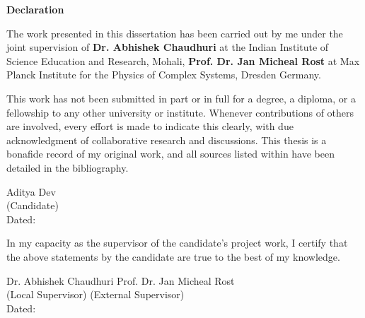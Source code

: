\begin{center}
    \textbf{\Large Declaration}
\end{center}
The work presented in this dissertation has been carried out by me under the joint supervision of 
\textbf{Dr. Abhishek Chaudhuri} at the Indian Institute of Science Education and Research, Mohali, 
\textbf{Prof. Dr.  Jan Micheal Rost} 
at Max Planck Institute for the Physics of Complex Systems, Dresden Germany. 

\vspace{0.4cm}

This work has not been submitted in part or in full for a degree, a diploma, or a fellowship to any other university or institute. Whenever contributions of others are involved, every effort is made to indicate this clearly, with due acknowledgment of collaborative research and discussions. This thesis is a bonafide record of my original work, and all sources listed within have been detailed in the bibliography.

\vspace{2cm}

\begin{flushright}
Aditya Dev
\\
(Candidate)
\\
Dated: 
\end{flushright}

In my capacity as the supervisor of the candidate's project work, I certify that the above statements by the candidate are true to the best of my knowledge.

\vspace{2cm}

\begin{flushleft}
    Dr. Abhishek Chaudhuri \hfill Prof. Dr. Jan Micheal Rost 
    \\
    (Local Supervisor) \hfill (External Supervisor)
    \\
    \vfill
    Dated: 
\end{flushleft}